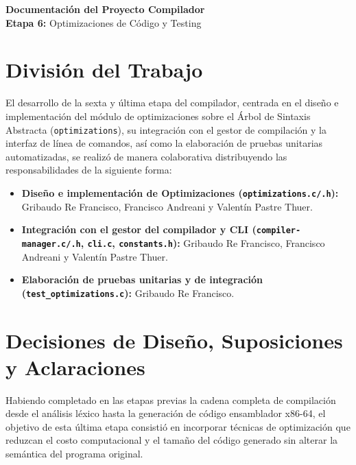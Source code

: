 \documentclass[12pt, a4paper]{article}
\begin{document}
\sloppy
\setlength{\emergencystretch}{3em}

\begin{center}
    {\LARGE \textbf{\textcolor{primary}{Documentación del Proyecto Compilador}}} \\
    \vspace{0.5cm}
    {\large \textbf{Etapa 6:} Optimizaciones de Código y Testing}
\end{center}
\vspace{0.8cm}

\section{División del Trabajo}
El desarrollo de la sexta y última etapa del compilador, centrada en el diseño e implementación del módulo de optimizaciones sobre el Árbol de Sintaxis Abstracta (\texttt{optimizations}), su integración con el gestor de compilación y la interfaz de línea de comandos, así como la elaboración de pruebas unitarias automatizadas, se realizó de manera colaborativa distribuyendo las responsabilidades de la siguiente forma:

\begin{itemize}
    \item \textbf{Diseño e implementación de Optimizaciones (\texttt{optimizations.c/.h}):} Gribaudo Re Francisco, Francisco Andreani y Valentín Pastre Thuer.
    \item \textbf{Integración con el gestor del compilador y CLI (\texttt{compiler-manager.c/.h}, \texttt{cli.c}, \texttt{constants.h}):} Gribaudo Re Francisco, Francisco Andreani y Valentín Pastre Thuer.
    \item \textbf{Elaboración de pruebas unitarias y de integración (\texttt{test\_optimizations.c}):} Gribaudo Re Francisco.
\end{itemize}

\section{Decisiones de Diseño, Suposiciones y Aclaraciones}
Habiendo completado en las etapas previas la cadena completa de compilación desde el análisis léxico hasta la generación de código ensamblador x86-64, el objetivo de esta última etapa consistió en incorporar técnicas de optimización que reduzcan el costo computacional y el tamaño del código generado sin alterar la semántica del programa original.
\end{document}
